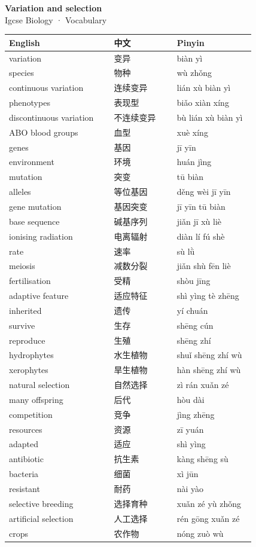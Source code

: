 \documentclass[11pt]{article}
\begin{document}
\begin{center}
  {\LARGE\bfseries Variation and selection}\\[0.35em]
  {\large Igcse Biology · Vocabulary}
\end{center}
\vspace{0.6em}

\begin{longtable}{@{}p{0.40\linewidth}p{0.24\linewidth}p{0.30\linewidth}@{}}
\toprule
\textbf{English} & \textbf{中文} & \textbf{Pinyin} \\
\midrule
\endhead
\bottomrule
\endlastfoot
variation & 变异 & biàn yì \\
species & 物种 & wù zhǒng \\
continuous variation & 连续变异 & lián xù biàn yì \\
phenotypes & 表现型 & biǎo xiàn xíng \\
discontinuous variation & 不连续变异 & bù lián xù biàn yì \\
ABO blood groups & 血型 & xuè xíng \\
genes & 基因 & jī yīn \\
environment & 环境 & huán jìng \\
mutation & 突变 & tū biàn \\
alleles & 等位基因 & děng wèi jī yīn \\
gene mutation & 基因突变 & jī yīn tū biàn \\
base sequence & 碱基序列 & jiǎn jī xù liè \\
ionising radiation & 电离辐射 & diàn lí fú shè \\
rate & 速率 & sù lǜ \\
meiosis & 减数分裂 & jiǎn shù fēn liè \\
fertilisation & 受精 & shòu jīng \\
adaptive feature & 适应特征 & shì yìng tè zhēng \\
inherited & 遗传 & yí chuán \\
survive & 生存 & shēng cún \\
reproduce & 生殖 & shēng zhí \\
hydrophytes & 水生植物 & shuǐ shēng zhí wù \\
xerophytes & 旱生植物 & hàn shēng zhí wù \\
natural selection & 自然选择 & zì rán xuǎn zé \\
many offspring & 后代 & hòu dài \\
competition & 竞争 & jìng zhēng \\
resources & 资源 & zī yuán \\
adapted & 适应 & shì yìng \\
antibiotic & 抗生素 & kàng shēng sù \\
bacteria & 细菌 & xì jūn \\
resistant & 耐药 & nài yào \\
selective breeding & 选择育种 & xuǎn zé yù zhǒng \\
artificial selection & 人工选择 & rén gōng xuǎn zé \\
crops & 农作物 & nóng zuò wù \\
\end{longtable}
\end{document}
